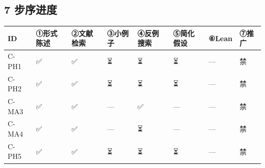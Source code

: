 \documentclass[
]{article}
\begin{document}
\subsection{7 步序进度}\label{ux6b65ux5e8fux8fdbux5ea6}

\begin{longtable}[]{@{}
  >{\raggedright\arraybackslash}p{}
  >{\raggedright\arraybackslash}p{}
  >{\raggedright\arraybackslash}p{}
  >{\raggedright\arraybackslash}p{}
  >{\raggedright\arraybackslash}p{}
  >{\raggedright\arraybackslash}p{}
  >{\raggedright\arraybackslash}p{}
  >{\raggedright\arraybackslash}p{}@{}}
\toprule\noalign{}
\begin{minipage}[b]{\linewidth}\raggedright
ID
\end{minipage} & \begin{minipage}[b]{\linewidth}\raggedright
①形式陈述
\end{minipage} & \begin{minipage}[b]{\linewidth}\raggedright
②文献检索
\end{minipage} & \begin{minipage}[b]{\linewidth}\raggedright
③小例子
\end{minipage} & \begin{minipage}[b]{\linewidth}\raggedright
④反例搜索
\end{minipage} & \begin{minipage}[b]{\linewidth}\raggedright
⑤简化假设
\end{minipage} & \begin{minipage}[b]{\linewidth}\raggedright
⑥Lean
\end{minipage} & \begin{minipage}[b]{\linewidth}\raggedright
⑦推广
\end{minipage} \\
\midrule\noalign{}
\endhead
\bottomrule\noalign{}
\endlastfoot
C-PH1 & ✅ & ✅ & ⏳ & ⏳ & ⏳ & --- & 禁 \\
C-PH2 & ✅ & ✅ & ⏳ & ⏳ & ⏳ & --- & 禁 \\
C-MA3 & ✅ & ✅ & --- & ✅ & --- & --- & 禁 \\
C-MA4 & ✅ & ✅ & --- & ⏳ & --- & --- & 禁 \\
C-PH5 & ✅ & ✅ & ⏳ & ⏳ & ⏳ & --- & 禁 \\

\end{longtable}
\end{document}
